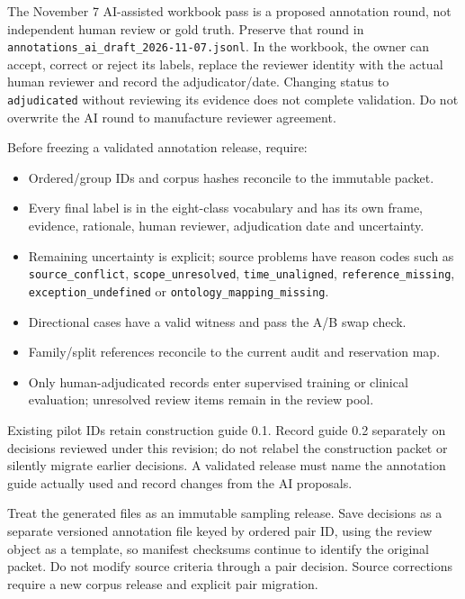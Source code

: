 \documentclass[10pt,letterpaper]{article}
\newcommand{\pathcode}[1]{\nolinkurl{#1}}
\begin{document}
The November 7 AI-assisted workbook pass is a proposed annotation round, not independent human review or gold truth. Preserve that round in \pathcode{annotations_ai_draft_2026-11-07.jsonl}. In the workbook, the owner can accept, correct or reject its labels, replace the reviewer identity with the actual human reviewer and record the adjudicator/date. Changing status to \pathcode{adjudicated} without reviewing its evidence does not complete validation. Do not overwrite the AI round to manufacture reviewer agreement.

Before freezing a validated annotation release, require:

\begin{itemize}
\item
  Ordered/group IDs and corpus hashes reconcile to the immutable packet.
\item
  Every final label is in the eight-class vocabulary and has its own frame, evidence, rationale, human reviewer, adjudication date and uncertainty.
\item
  Remaining uncertainty is explicit; source problems have reason codes such as \pathcode{source_conflict}, \pathcode{scope_unresolved}, \pathcode{time_unaligned}, \pathcode{reference_missing}, \pathcode{exception_undefined} or \pathcode{ontology_mapping_missing}.
\item
  Directional cases have a valid witness and pass the A/B swap check.
\item
  Family/split references reconcile to the current audit and reservation map.
\item
  Only human-adjudicated records enter supervised training or clinical evaluation; unresolved review items remain in the review pool.
\end{itemize}

Existing pilot IDs retain construction guide 0.1. Record guide 0.2 separately on decisions reviewed under this revision; do not relabel the construction packet or silently migrate earlier decisions. A validated release must name the annotation guide actually used and record changes from the AI proposals.

Treat the generated files as an immutable sampling release. Save decisions as a separate versioned annotation file keyed by ordered pair ID, using the review object as a template, so manifest checksums continue to identify the original packet. Do not modify source criteria through a pair decision. Source corrections require a new corpus release and explicit pair migration.
\end{document}
